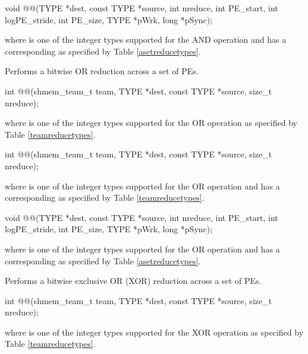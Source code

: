 \begin{apidefinition}
\begin{DeprecateBlock}
\begin{CsynopsisCol}
void @@(TYPE *dest, const TYPE *source, int nreduce, int PE_start, int logPE_stride, int PE_size, TYPE *pWrk, long *pSync);
\end{CsynopsisCol}
\end{DeprecateBlock}
where \TYPE{} is one of the integer types supported for the AND operation and has a corresponding \TYPENAME{} as specified by Table \ref{asetreducetypes}.

\label{subsec:shmem_or_reduce}
Performs a bitwise OR reduction across a set of \acp{PE}.\newline

\begin{C11synopsis}
int @@(shmem_team_t team, TYPE *dest, const TYPE *source, size_t nreduce);
\end{C11synopsis}
where \TYPE{} is one of the integer types supported for the OR operation as specified by Table \ref{teamreducetypes}.

\begin{Csynopsis}
\end{Csynopsis}
\begin{CsynopsisCol}
int @@(shmem_team_t team, TYPE *dest, const TYPE *source, size_t nreduce);
\end{CsynopsisCol}
where \TYPE{} is one of the integer types supported for the OR operation and has a corresponding \TYPENAME{} as specified by Table \ref{teamreducetypes}.

\begin{DeprecateBlock}
\begin{CsynopsisCol}
void @@(TYPE *dest, const TYPE *source, int nreduce, int PE_start, int logPE_stride, int PE_size, TYPE *pWrk, long *pSync);
\end{CsynopsisCol}
\end{DeprecateBlock}
where \TYPE{} is one of the integer types supported for the OR operation and has a corresponding \TYPENAME{} as specified by Table \ref{asetreducetypes}.

\label{subsec:shmem_xor_reduce}
Performs a bitwise exclusive OR (XOR) reduction across a set of \acp{PE}.\newline

\begin{C11synopsis}
int @@(shmem_team_t team, TYPE *dest, const TYPE *source, size_t nreduce);
\end{C11synopsis}
where \TYPE{} is one of the integer types supported for the XOR operation as specified by Table \ref{teamreducetypes}.


\end{apidefinition}
